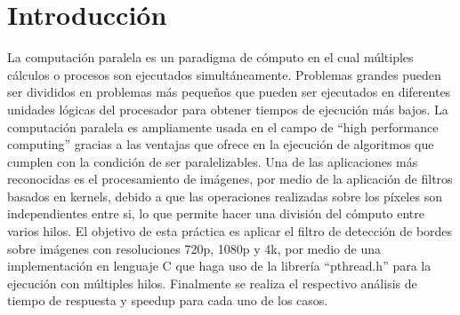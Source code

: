 





\maketitle



\section{Introducción}
La computación paralela es un paradigma de cómputo en el cual múltiples cálculos o procesos son ejecutados simultáneamente. Problemas grandes pueden ser divididos en problemas más pequeños que pueden ser ejecutados en diferentes unidades lógicas del procesador para obtener tiempos de ejecución más bajos. La computación paralela es ampliamente usada en el campo de ``high performance computing'' gracias a las ventajas que ofrece en la ejecución de algoritmos que cumplen con la condición de ser paralelizables. Una de las aplicaciones más reconocidas es el procesamiento de imágenes, por medio de la aplicación de filtros basados en kernels, debido a que las operaciones realizadas sobre los píxeles son independientes entre si, lo que permite hacer una división del cómputo entre varios hilos. El objetivo de esta práctica es aplicar el filtro de detección de bordes sobre imágenes con resoluciones 720p, 1080p y 4k, por medio de una implementación en lenguaje C que haga uso de la librería ``pthread.h'' para la ejecución con múltiples hilos. Finalmente se realiza el respectivo análisis de tiempo de respuesta y speedup para cada uno de los casos.

